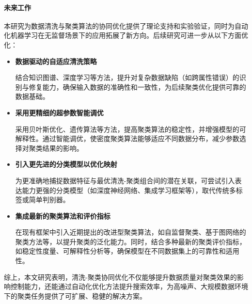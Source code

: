 \documentclass[10pt]{article} %
\numberwithin{equation}{section}
\begin{document}
\paragraph{未来工作}  
本研究为数据清洗与聚类算法的协同优化提供了理论支持和实验验证，同时为自动化机器学习在无监督场景下的应用拓展了新方向。后续研究可进一步从以下方面优化：

\begin{itemize}
    \item \textbf{数据驱动的自适应清洗策略} 
 
    结合知识图谱、深度学习等方法，提升对复杂数据缺陷（如跨属性错误）的识别与修复能力，确保输入数据的准确性和一致性，为后续聚类优化提供可靠的数据基础。

    \item \textbf{采用更精细的超参数智能调优}  

    采用贝叶斯优化、遗传算法等方法，提高聚类算法的稳定性，并增强模型的可解释性。通过智能调优，使密度聚类算法能够适应不同数据分布，减少参数选择对聚类结果的影响。

    \item \textbf{引入更先进的分类模型以优化映射}  

    为更准确地捕捉数据特征与最优清洗-聚类组合间的潜在关联，可尝试引入表达能力更强的分类模型（如深度神经网络、集成学习框架等），取代传统多标签或简单判别器。

    \item \textbf{集成最新的聚类算法和评价指标}  

    在现有框架中引入近期提出的改进型聚类算法，如自监督聚类、基于图网络的聚类方法等，以提升聚类的泛化能力。同时，结合多种最新的聚类评价指标，如稳定性度量、可解释性分析等，确保模型在不同数据集上的可靠性和适用性。
\end{itemize}

综上，本文研究表明，清洗-聚类协同优化不仅能够提升数据质量对聚类效果的影响控制能力，还能通过自动化优化方法提升搜索效率，为高噪声、大规模数据环境下的聚类任务提供了可扩展、稳健的解决方案。

\begingroup
\small %

    
\endgroup
\end{document}

